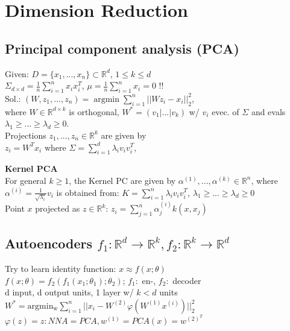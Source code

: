 \section*{Dimension Reduction}
\subsection*{Principal component analysis (PCA)}
Given: $D=\{x_1,...,x_n\} \subset \mathbb{R}^d$, $1\leq k \leq d$\\
$\Sigma_{d \times d} = \frac{1}{n}\sum_{i=1}^n x_i x_i^T$, $\mu =\frac{1}{n}\sum_{i = 1}^n x_i = 0$ !!\\
Sol.:
$(W,z_1,...,z_n) = \operatorname{argmin} \sum_{i=1}^n||W z_i - x_i||_2^2$,\\
where $W \in \mathbb{R}^{d \times k}$ is orthogonal, $W^* = (v_1|...|v_k)$ w/ $v_i$ evec. of $\Sigma$ and evals $\lambda_1 \geq ... \geq \lambda_d \geq 0$.\\
Projections $z_1,...,z_n\in\mathbb{R}^k$ are given by\\
$z_i = W^T x_i$ where $\Sigma = \sum_{i=1}^d \lambda_i v_i v_i^T$, 

\textbf{Kernel PCA}\\
For general $k\geq1$, the Kernel PC are given by $\alpha^{(1)},...,\alpha^{(k)}\in \mathbb{R}^n$, where $\alpha^{(i)} = \frac{1}{\sqrt{\lambda_i}}v_i$ is obtained from: $K = \sum_{i=1}^n \lambda_i v_i v_i^T$, $\lambda_1 \geq ... \geq \lambda_d \geq 0$\\
Point $x$ projected as $z \in \mathbb{R}^k$:
$z_i = \sum_{j=1}^n\alpha_j^{(i)}k(x,x_j)$

\subsection*{Autoencoders $f_1: \mathbb{R}^d \rightarrow \mathbb{R}^k, f_2:\mathbb{R}^k \rightarrow \mathbb{R}^d$}
Try to learn identity function: $x \approx f(x;\theta)$\\
$f(x;\theta) = f_2(f_1(x_1;\theta_1);\theta_2)$; $f_1:$ en-, $f_2:$ decoder\\
d input, d output units, 1 layer w/ $k<d$ units\\
$ W^*=\operatorname{argmin_w}\sum_{i=1}^n||x_i-W^{(2)}\varphi(W^{(1)}x^{(i)})||_2^2$\\
$\varphi(z)=z: NNA=PCA, w^{(1)}=PCA(x)=w^{(2)^T}$